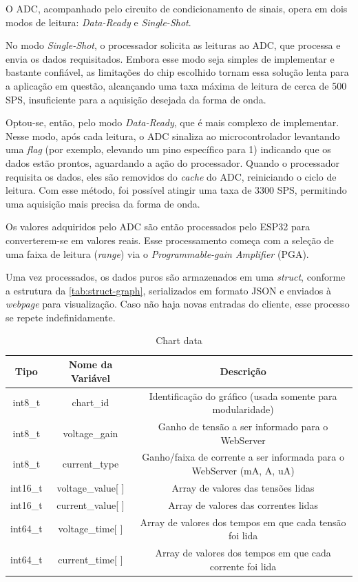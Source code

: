 O \gls{ADC}, acompanhado pelo circuito de condicionamento de sinais, opera em dois modos de leitura: \textit{Data-Ready} e \textit{Single-Shot}.

No modo \textit{Single-Shot}, o processador solicita as leituras ao \gls{ADC}, que processa e envia os dados requisitados. Embora esse modo seja simples de implementar e bastante confiável, as limitações do chip escolhido tornam essa solução lenta para a aplicação em questão, alcançando uma taxa máxima de leitura de cerca de 500 \gls{SPS}, insuficiente para a aquisição desejada da forma de onda.

Optou-se, então, pelo modo \textit{Data-Ready}, que é mais complexo de implementar. Nesse modo, após cada leitura, o \gls{ADC} sinaliza ao microcontrolador levantando uma \textit{flag} (por exemplo, elevando um pino específico para 1) indicando que os dados estão prontos, aguardando a ação do processador. Quando o processador requisita os dados, eles são removidos do \textit{cache} do \gls{ADC}, reiniciando o ciclo de leitura. Com esse método, foi possível atingir uma taxa de 3300 \gls{SPS}, permitindo uma aquisição mais precisa da forma de onda.

Os valores adquiridos pelo \gls{ADC} são então processados pelo ESP32 para converterem-se em valores reais. Esse processamento começa com a seleção de uma faixa de leitura (\textit{range}) via o \textit{Programmable-gain Amplifier} (\gls{PGA}).

Uma vez processados, os dados puros são armazenados em uma \textit{struct}, conforme a estrutura da \autoref{tab:struct-graph}, serializados em formato JSON e enviados à \textit{webpage} para visualização. Caso não haja novas entradas do cliente, esse processo se repete indefinidamente.

\begin{table}[h!]
\centering
\caption{Chart data}
\begin{tabular}{|c|c|c|}
    \hline
    \textbf{Tipo} & \textbf{Nome da Variável} & \textbf{Descrição} \\ \hline
    int8\_t & chart\_id & Identificação do gráfico (usada somente para modularidade) \\ \hline
    int8\_t & voltage\_gain & Ganho de tensão a ser informado para o WebServer \\ \hline
    int8\_t & current\_type & Ganho/faixa de corrente a ser informada para o WebServer (mA, A, uA) \\ \hline
    int16\_t & voltage\_value[ ] & Array de valores das tensões lidas \\ \hline
    int16\_t & current\_value[ ] & Array de valores das correntes lidas \\ \hline
    int64\_t & voltage\_time[ ] & Array de valores dos tempos em que cada tensão foi lida \\ \hline
    int64\_t & current\_time[ ] & Array de valores dos tempos em que cada corrente foi lida \\ \hline
\end{tabular}
\label{tab:struct-graph}
\fonte{}
\end{table}

